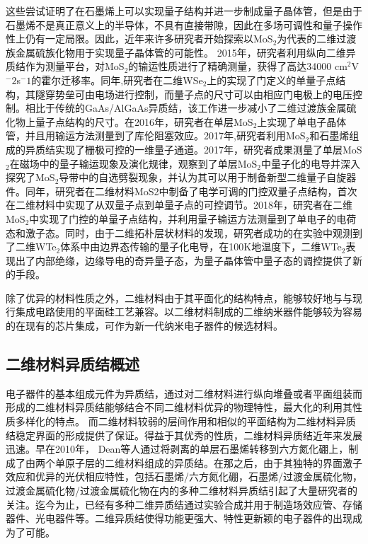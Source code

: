 这些尝试证明了在石墨烯上可以实现量子结构并进一步制成量子晶体管，但是由于石墨烯不是真正意义上的半导体，不具有直接带隙，因此在多场可调性和量子操作性上仍有一定局限。因此，近年来许多研究者开始探索以MoS$_2$为代表的二维过渡族金属硫族化物用于实现量子晶体管的可能性。
2015年，研究者利用纵向二维异质结作为测量平台，对MoS$_2$的输运性质进行了精确测量，获得了高达34000 cm$^2$V$^-2$s$^-1$的霍尔迁移率。同年,研究者在二维WSe$_2$上的实现了门定义的单量子点结构，其隧穿势垒可由电场进行控制，而量子点的尺寸可以由相应门电极上的电压控制。相比于传统的GaAs/AlGaAs异质结，该工作进一步减小了二维过渡族金属硫化物上量子点结构的尺寸。在2016年，研究者在单层MoS$_2$上实现了单电子晶体管，并且用输运方法测量到了库伦阻塞效应。2017年,研究者利用MoS$_2$和石墨烯组成的异质结实现了栅极可控的一维量子通道。2017年，研究者成果测量了单层MoS$_2$在磁场中的量子输运现象及演化规律，观察到了单层MoS$_2$中量子化的电导并深入探究了MoS$_2$导带中的自选劈裂现象，并认为其可以用于制备新型二维量子自旋器件。同年，研究者在二维材料MoS2中制备了电学可调的门控双量子点结构，首次在二维材料中实现了从双量子点到单量子点的可控调节。2018年，研究者在二维MoS$_2$中实现了门控的单量子点结构，并利用量子输运方法测量到了单电子的电荷态和激子态。同时，由于二维拓朴层状材料的发现，研究者成功的在实验中观测到了二维WTe$_2$体系中由边界态传输的量子化电导，在100K地温度下，二维WTe$_2$表现出了内部绝缘，边缘导电的奇异量子态，为量子晶体管中量子态的调控提供了新的手段。

除了优异的材料性质之外，二维材料由于其平面化的结构特点，能够较好地与与现行集成电路使用的平面硅工艺兼容。以二维材料制成的二维纳米器件能够较为容易的在现有的芯片集成，可作为新一代纳米电子器件的候选材料。


\subsection{二维材料异质结概述}
电子器件的基本组成元件为异质结，通过对二维材料进行纵向堆叠或者平面组装而形成的二维材料异质结能够结合不同二维材料优异的物理特性，最大化的利用其性质多样化的特点。 而二维材料较弱的层间作用和相似的平面结构为二维材料异质结稳定界面的形成提供了保证。得益于其优秀的性质，二维材料异质结近年来发展迅速。早在2010年， Dean等人通过将剥离的单层石墨烯转移到六方氮化硼上，制成了由两个单原子层的二维材料组成的异质结。在那之后，由于其独特的界面激子效应和优异的光伏相应特性，包括石墨烯/六方氮化硼，石墨烯/过渡金属硫化物，过渡金属硫化物/过渡金属硫化物在内的多种二维材料异质结引起了大量研究者的关注。迄今为止，已经有多种二维异质结通过实验合成并用于制造场效应管、存储器件、光电器件等。二维异质结使得功能更强大、特性更新颖的电子器件的出现成为了可能。

